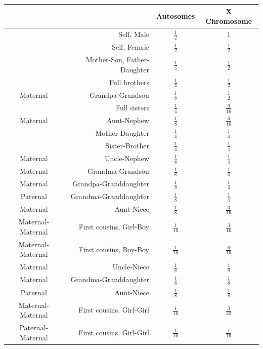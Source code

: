 \documentclass[11pt]{article} %
\begin{document}
\bgroup
\def\arraystretch{1.5}
\begin{table}[ht]
\small
\centering
\begin{tabular}{crcc}
  \hline
&& Autosomes & X Chromosome\\
  \hline
& Self, Male & $\frac{1}{2}$ & $1$ \\ \hline
& Self, Female & $\frac{1}{2}$ & $\frac{1}{2}$ \\
&Mother-Son, Father-Daughter &$\frac{1}{4}$& $\frac{1}{2}$\\
&Full brothers &$\frac{1}{4}$&$\frac{1}{2}$\\
Maternal&Grandpa-Grandson &$\frac{1}{8}$&$\frac{1}{2}$\\ \hline

&Full sisters & $\frac{1}{4}$ & $\frac{6}{16}$\\
Maternal&Aunt-Nephew&$\frac{1}{8}$&$\frac{6}{16}$\\ \hline


&Mother-Daughter &$\frac{1}{4}$ & $\frac{1}{4}$\\
&Sister-Brother &$\frac{1}{4}$&$\frac{1}{4}$\\
Maternal&Uncle-Nephew &$\frac{1}{8}$&$\frac{1}{4}$\\
Maternal&Grandma-Grandson &$\frac{1}{8}$&$\frac{1}{4}$\\
Maternal&Grandpa-Granddaughter&$\frac{1}{8}$&$\frac{1}{4}$\\
Paternal&Grandma-Granddaughter &$\frac{1}{8}$&$\frac{1}{4}$\\ \hline

Maternal& Aunt-Niece &$\frac{1}{8}$&$\frac{3}{16}$\\
Maternal-Maternal& First cousins, Girl-Boy & $\frac{1}{16}$ & $\frac{3}{16}$\\
Maternal-Maternal& First cousins, Boy-Boy & $\frac{1}{16}$ & $\frac{6}{16}$\\
 \hline

Maternal&Uncle-Niece &$\frac{1}{8}$&$\frac{1}{8}$\\
Maternal&Grandma-Granddaughter &$\frac{1}{8}$&$\frac{1}{8}$\\
Paternal&Aunt-Niece &$\frac{1}{8}$&$\frac{1}{8}$\\ \hline

Maternal-Maternal & First cousins, Girl-Girl & $\frac{1}{16}$ & $\frac{3}{32}$\\ \hline

Paternal-Maternal & First cousins, Girl-Girl & $\frac{1}{16}$ & $\frac{1}{16}$\\ \hline


\end{tabular}
\end{table}
\end{document}
